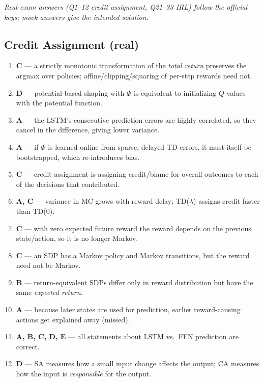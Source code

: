 \documentclass[11pt,oneside]{article}
\begin{document}
\textit{\small Real-exam answers (Q1--12 credit assignment, Q21--33 IRL) follow the official keys;
mock answers give the intended solution.}

\subsection*{Credit Assignment (real)}
\begin{enumerate}[label=\textbf{Q\arabic*.}, leftmargin=3em, itemsep=3pt]
  \item \textbf{C} --- a strictly monotonic transformation of the \emph{total return} preserves the argmax over policies; affine/clipping/squaring of per-step rewards need not.
  \item \textbf{D} --- potential-based shaping with $\Phi$ is equivalent to initializing $Q$-values with the potential function.
  \item \textbf{A} --- the LSTM's consecutive prediction errors are highly correlated, so they cancel in the difference, giving lower variance.
  \item \textbf{A} --- if $\Phi$ is learned online from sparse, delayed TD-errors, it must itself be bootstrapped, which re-introduces bias.
  \item \textbf{C} --- credit assignment is assigning credit/blame for overall outcomes to each of the decisions that contributed.
  \item \textbf{A, C} --- variance in MC grows with reward delay; TD($\lambda$) assigns credit faster than TD($0$).
  \item \textbf{C} --- with zero expected future reward the reward depends on the previous state/action, so it is no longer Markov.
  \item \textbf{C} --- an SDP has a Markov policy and Markov transitions, but the reward need not be Markov.
  \item \textbf{B} --- return-equivalent SDPs differ only in reward distribution but have the same \emph{expected return}.
  \item \textbf{A} --- because later states are used for prediction, earlier reward-causing actions get explained away (missed).
  \item \textbf{A, B, C, D, E} --- all statements about LSTM vs.\ FFN prediction are correct.
  \item \textbf{D} --- SA measures how a small input change affects the output; CA measures how the input is \emph{responsible} for the output.
\end{enumerate}
\end{document}
